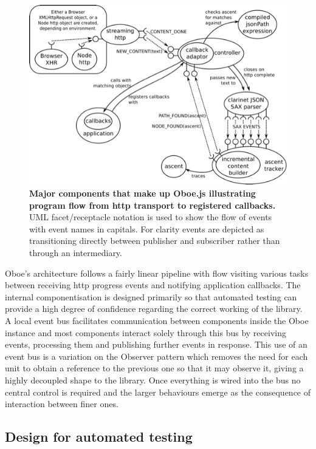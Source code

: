 \documentclass[]{article}
\makeatletter
\def\maxwidth{\ifdim\Gin@nat@width>\linewidth\linewidth
\else\Gin@nat@width\fi}
\let\Oldincludegraphics\includegraphics
\renewcommand{\includegraphics}[1]{\Oldincludegraphics[width=\maxwidth]{#1}}
\makeatother
\begin{document}
\begin{figure}[htbp]
\centering
\includegraphics{images/overallDesign.png}
\caption{\textbf{Major components that make up Oboe.js illustrating
program flow from http transport to registered callbacks.} UML
facet/receptacle notation is used to show the flow of events with event
names in capitals. For clarity events are depicted as transitioning
directly between publisher and subscriber rather than through an
intermediary. \label{overallDesign}}
\end{figure}

Oboe's architecture follows a fairly linear pipeline with flow visiting
various tasks between receiving http progress events and notifying
application callbacks. The internal componentisation is designed
primarily so that automated testing can provide a high degree of
confidence regarding the correct working of the library. A local event
bus facilitates communication between components inside the Oboe
instance and most components interact solely through this bus by
receiving events, processing them and publishing further events in
response. This use of an event bus is a variation on the Observer
pattern which removes the need for each unit to obtain a reference to
the previous one so that it may observe it, giving a highly decoupled
shape to the library. Once everything is wired into the bus no central
control is required and the larger behaviours emerge as the consequence
of interaction between finer ones.

\subsection{Design for automated testing}
\end{document}
